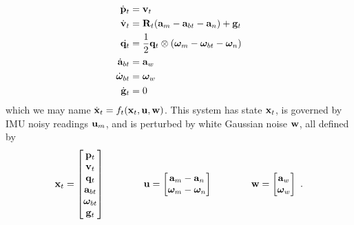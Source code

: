 %
\begin{subequations}
%
\begin{align}
\dot{{\bf p}}_t &= {\bf v}_t \label{equ:pos} \\
\dot{{\bf v}}_t &= {\bf R}_t({\bf a}_m - {\bf a}_{bt} - {\bf a}_n) + {\bf g}_t \label{equ:vel} \\
\dot{{\bf q}_t} &= \frac{1}{2}{\bf q}_t\otimes({\bm \omega}_m - {\bm \omega}_{bt} - {\bm \omega}_n) \label{equ:quat}\\
\dot{{\bf a}}_{bt} &= {\bf a}_w \label{equ:abias}\\
\dot{{\bm \omega}}_{bt} &= {\bm \omega}_w \label{equ:wbias}\\
\dot{{\bf g}}_t &= 0 \label{equ:grav}
\end{align}%
\end{subequations}
%
which we may name $\dot{{\bf x}}_t=f_t({\bf x}_t,{\bf u},{\bf w})$. 
This system has state ${\bf x}_t$, is governed by IMU noisy readings ${\bf u}_m$, and is perturbed by white Gaussian noise ${\bf w}$, all defined by
%
\begin{equation}
{\bf x}_t = \begin{bmatrix}
{\bf p}_t \\ {\bf v}_t \\ {\bf q}_t \\ {\bf a}_{bt} \\ {\bm \omega}_{bt} \\ {\bf g}_t
\end{bmatrix} 
\qquad\qquad
{\bf u} = \begin{bmatrix}
{\bf a}_m - {\bf a}_n \\ {\bm \omega}_m - {\bm \omega}_n
\end{bmatrix}
\qquad\qquad
{\bf w} = \begin{bmatrix}
{\bf a}_w \\ {\bm \omega}_w
\end{bmatrix}~.
\end{equation}
%

